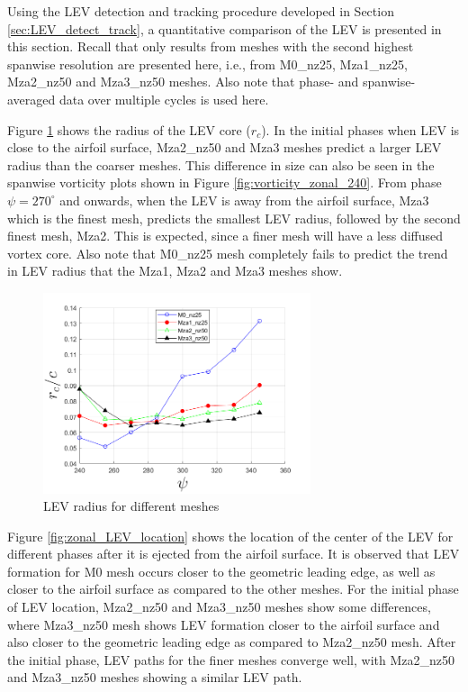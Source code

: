 Using the LEV detection and tracking procedure developed in Section \ref{sec:LEV_detect_track}, a quantitative comparison of the LEV is presented in this section. 
Recall that only results from meshes with the second highest spanwise resolution are presented here, i.e., from M0\_nz25, Mza1\_nz25, Mza2\_nz50 and Mza3\_nz50 meshes.
Also note that phase- and spanwise-averaged data over multiple cycles is used here.

Figure \ref{fig:zonal_LEV_radius} shows the radius of the LEV core ($r_c$).
In the initial phases when LEV is close to the airfoil surface, Mza2\_nz50 and Mza3 meshes predict a larger LEV radius than the coarser meshes. 
This difference in size can also be seen in the spanwise vorticity plots shown in Figure \ref{fig:vorticity_zonal_240}.
From phase $\psi = 270^\circ$ and onwards, when the LEV is away from the airfoil surface, Mza3 which is the finest mesh, predicts the smallest LEV radius, followed by the second finest mesh, Mza2. 
This is expected, since a finer mesh will have a less diffused vortex core. Also note that M0\_nz25 mesh completely fails to predict the trend in LEV radius that the Mza1, Mza2 and Mza3 meshes show.

\begin{figure}[H]
	\centering
	\includegraphics[width=0.7\textwidth]{figures/zonal_adapt_results/LEV/LEV_radius_vp}
	\caption{ LEV radius for different meshes}
	\label{fig:zonal_LEV_radius}
\end{figure}

Figure \ref{fig:zonal_LEV_location} shows the location of the center of the LEV for different phases after it is ejected from the airfoil surface. 
It is observed that LEV formation for M0 mesh occurs closer to the geometric leading edge, as well as closer to the airfoil surface as compared to the other meshes.
For the initial phase of LEV location, Mza2\_nz50 and Mza3\_nz50 meshes show some differences, where Mza3\_nz50 mesh shows LEV formation closer to the airfoil surface and also closer to the geometric leading edge as compared to Mza2\_nz50 mesh.
After the initial phase, LEV paths for the finer meshes converge well, with Mza2\_nz50 and Mza3\_nz50 meshes showing a similar LEV path.



